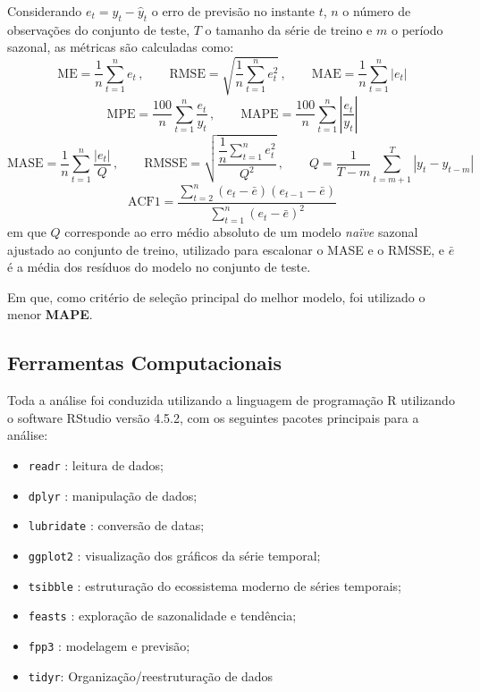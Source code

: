 \documentclass[12pt, a4paper]{article}
\newcommand{\pkg}[1]{\texttt{#1}}
\begin{document}
Considerando $e_t = y_t-\hat{y}_t$ o erro de previsão no instante $t$, $n$ o número de observações do conjunto de teste, $T$ o tamanho da série de treino e $m$ o período sazonal, as métricas são calculadas como:
\begin{equation}
  \text{ME}=\frac{1}{n}\sum_{t=1}^{n}e_t\,, \qquad
  \text{RMSE}=\sqrt{\frac{1}{n}\sum_{t=1}^{n}e_t^2}\,, \qquad
  \text{MAE}=\frac{1}{n}\sum_{t=1}^{n}|e_t|
\end{equation}
\begin{equation}
  \text{MPE}=\frac{100}{n}\sum_{t=1}^{n}\frac{e_t}{y_t}\,, \qquad
  \text{MAPE}=\frac{100}{n}\sum_{t=1}^{n}\left|\frac{e_t}{y_t}\right|
\end{equation}
\begin{equation}
  \text{MASE}=\frac{1}{n}\sum_{t=1}^{n}\frac{|e_t|}{Q}\,, \qquad
  \text{RMSSE}=\sqrt{\frac{\dfrac{1}{n}\displaystyle\sum_{t=1}^{n}e_t^2}{Q^2}}\,, \qquad
  Q=\frac{1}{T-m}\sum_{t=m+1}^{T}|y_t-y_{t-m}|
\end{equation}
\begin{equation}
  \text{ACF1}=\frac{\displaystyle\sum_{t=2}^{n}(e_t-\bar{e})(e_{t-1}-\bar{e})}{\displaystyle\sum_{t=1}^{n}(e_t-\bar{e})^2}
\end{equation}
em que $Q$ corresponde ao erro médio absoluto de um modelo \emph{naïve} sazonal ajustado ao conjunto de treino, utilizado para escalonar o MASE e o RMSSE, e $\bar{e}$ é a média dos resíduos do modelo no conjunto de teste.

Em que, como critério de seleção principal do melhor modelo, foi utilizado o menor \textbf{MAPE}.

\subsection{Ferramentas Computacionais}

Toda a análise foi conduzida utilizando a linguagem de programação R \citep{r2024} utilizando o software RStudio versão 4.5.2\cite{rstudio}, com os seguintes pacotes principais para a análise:

\begin{itemize}
  \item \pkg{readr} \citep{wickham2023readr}: leitura de dados;
  \item \pkg{dplyr} \citep{wickham2023dplyr}: manipulação de dados;
  \item \pkg{lubridate} \citep{grolemund2011lubridate}: conversão de datas;
  \item \pkg{ggplot2} \citep{wickham2016ggplot2}: visualização dos gráficos da série temporal;
  \item \pkg{tsibble} \citep{wang2020tsibble}: estruturação do ecossistema moderno de séries
        temporais;
  \item \pkg{feasts} \citep{ogrady2021feasts}: exploração de
        sazonalidade e tendência;
  \item \pkg{fpp3} \citep{hyndman2021fpp3}: modelagem e previsão;
  \item \pkg{tidyr}\citep{tidyr}: Organização/reestruturação de dados
\end{itemize}
\end{document}
